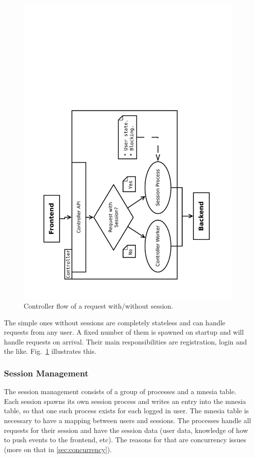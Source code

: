 \documentclass[11pt,a4paper]{report}
\begin{document}
\begin{figure}[h]
 \centering
 \includegraphics[width=13cm, angle=-90]{./graphics/Concurrency_-_session_proc.pdf}
 \vspace{-1cm}
 \caption{Controller flow of a request with/without session.}
 \label{fig:controller:session_proc}
\end{figure}

The simple ones without sessions are completely stateless and can handle
requests from any user.
A fixed number of them is spawned on startup and will handle requests on
arrival.
Their main responsibilities are registration, login and the like.
Fig.~\ref{fig:controller:session_proc} illustrates this.

\subsubsection{Session Management}
The session management consists of a group of processes and a mnesia table.
Each session spawns its own session process and writes an entry into the mnesia
table, so that one such process exists for each logged in user.
The mnesia table is necessary to have a mapping between users and sessions.
The processes handle all requests for their session and have the session data
(user data, knowledge of how to push events to the frontend, etc).
The reasons for that are concurrency issues
(more on that in \ref{sec:concurrency}).
\end{document}
